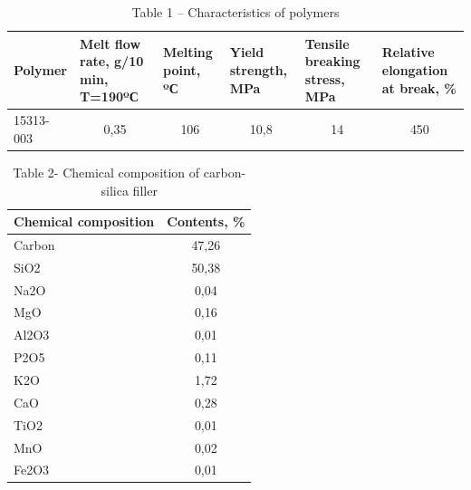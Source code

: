 \begin{table}[H]
\caption*{Table 1 -- Characteristics of polymers}
\centering
\begin{tabular}{|p{}|p{}|p{}|p{}|p{}|p{}|}
\hline
Polymer   & Melt flow rate, g/10 min, T=190ºС & Melting point, ºС        & Yield strength, MPa       & Tensile breaking stress, MPa & Relative elongation at break, \% \\ \hline
15313-003 & \multicolumn{1}{c|}{0,35}         & \multicolumn{1}{c|}{106} & \multicolumn{1}{c|}{10,8} & \multicolumn{1}{c|}{14}      & \multicolumn{1}{c|}{450}         \\ \hline
\end{tabular}
\end{table}

\begin{table}[H]
\caption*{Table 2- Chemical composition of carbon-silica filler}
\centering
\begin{tabular}{|l|c|}
\hline
\textbf{Chemical composition} & \multicolumn{1}{l|}{\textbf{Contents, \%}} \\ \hline
Carbon                        & 47,26                                      \\ \hline
SiO2                          & 50,38                                      \\ \hline
Na2O                          & 0,04                                       \\ \hline
MgO                           & 0,16                                       \\ \hline
Al2O3                         & 0,01                                       \\ \hline
P2O5                          & 0,11                                       \\ \hline
K2O                           & 1,72                                       \\ \hline
CaO                           & 0,28                                       \\ \hline
TiO2                          & 0,01                                       \\ \hline
MnO                           & 0,02                                       \\ \hline
Fe2O3                         & 0,01                                       \\ \hline
\end{tabular}
\end{table}

